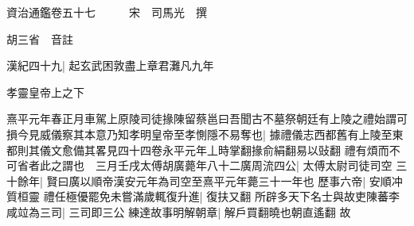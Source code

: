 






























































資治通鑑卷五十七　　　宋　司馬光　撰

胡三省　音註

漢紀四十九|{
	起玄武困敦盡上章君灘凡九年}


孝靈皇帝上之下

熹平元年春正月車駕上原陵司徒掾陳留蔡邕曰吾聞古不墓祭朝廷有上陵之禮始謂可損今見威儀察其本意乃知孝明皇帝至孝惻隱不易奪也|{
	據禮儀志西都舊有上陵至東都則其儀文愈備其畧見四十四卷永平元年丄時掌翻掾俞絹翻易以䜴翻}
禮有煩而不可省者此之謂也　三月壬戌太傅胡廣薨年八十二廣周流四公|{
	太傅太尉司徒司空}
三十餘年|{
	賢曰廣以順帝漢安元年為司空至熹平元年薨三十一年也}
歷事六帝|{
	安順冲質桓靈}
禮任極優罷免未嘗滿歲輒復升進|{
	復扶又翻}
所辟多天下名士與故吏陳蕃李咸竝為三司|{
	三司即三公}
練達故事明解朝章|{
	解戶買翻曉也朝直遙翻}
故

